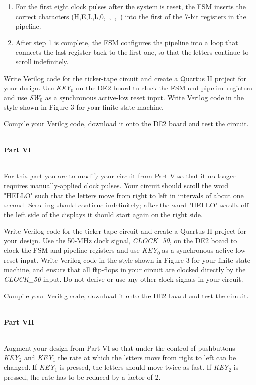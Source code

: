\documentclass[epsfig,10pt,fullpage]{article}
\begin{document}
\begin{enumerate}
\item
For the first eight clock pulses after the system is reset, the FSM 
inserts the correct characters (H,E,L,L,0,~,~,~) into the first of the 7-bit registers
in the pipeline.
\item
After step 1 is complete, the FSM configures the pipeline into
a loop that connects the last register back to the first one, 
so that the letters continue to scroll indefinitely.
\end{enumerate}

\noindent
Write Verilog code for the ticker-tape circuit and create a Quartus II
project for your design. Use {\it KEY}$_0$
on the DE2 board to clock the FSM and pipeline registers and use 
{\it SW}$_0$ as a synchronous active-low reset input. Write Verilog code 
in the style shown in Figure 3 for your finite state machine.

Compile your Verilog code, download it onto the DE2 board and test the circuit. 

~\\
\noindent
{\bf Part VI}

~\\
\noindent
For this part you are to modify your circuit from Part V so that it no longer
requires manually-applied clock pulses. 
Your circuit should scroll the word "HELLO" such that the
letters move from right to left in intervals of about one second.
Scrolling should continue indefinitely; after the word "HELLO" scrolls
off the left side of the displays it should start again on the right side. 

\noindent
Write Verilog code for the ticker-tape circuit and create a Quartus II
project for your design. Use the 50-MHz clock signal, {\it CLOCK\_50},
on the DE2 board to clock the FSM and pipeline registers and use 
{\it KEY}$_0$ as a synchronous active-low reset input. Write Verilog code 
in the style shown in Figure 3 for your finite state machine, 
and ensure that all flip-flops in your circuit are clocked directly by the 
{\it CLOCK\_50} input. Do not derive or use any other clock signals 
in your circuit.

Compile your Verilog code, download it onto the DE2 board and test the circuit. 

~\\
\noindent
{\bf Part VII}

~\\
\noindent
Augment your design from Part VI so that under the control of pushbuttons
{\it KEY}$_2$ and {\it KEY}$_1$ the rate at which the letters move from right to left
can be changed. If {\it KEY}$_1$ is pressed, the letters should move twice as fast.
If {\it KEY}$_2$ is pressed, the rate has to be reduced by a factor of 2.
\end{document}
